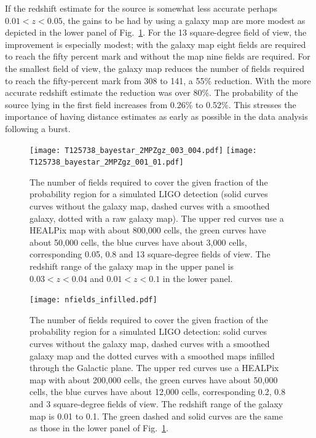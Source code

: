 \documentclass[useAMS,usenatbib]{mn2e}
\begin{document}
If the redshift estimate for the source is somewhat less accurate
perhaps $0.01<z<0.05$, the gains to be had by using a galaxy map are
more modest as depicted in the lower panel of Fig.~\ref{fig:bayestar}.
For the 13 square-degree field of view, the improvement is especially
modest; with the galaxy map eight fields are required to reach the
fifty percent mark and without the map nine fields are required.  For
the smallest field of view, the galaxy map reduces the number of
fields required to reach the fifty-percent mark from 308 to 141, a
55\% reduction.  With the more accurate redshift estimate the
reduction was over 80\%.  The probability of the source lying in the
first field increases from 0.26\% to 0.52\%.  This stresses the
importance of having distance estimates as early as possible in the
data analysis following a burst.
\begin{figure}
  \texttt{[image: T125738\_bayestar\_2MPZgz\_003\_004.pdf]}
  \texttt{[image: T125738\_bayestar\_2MPZgz\_001\_01.pdf]}
  \caption{The number of fields required to cover the given fraction
    of the probability region for a simulated LIGO detection (solid curves
    curves without the galaxy map, dashed curves with a smoothed
    galaxy, dotted with a raw galaxy map).  The upper red
    curves use a HEALPix map with about 800,000 cells, the green
    curves have about 50,000 cells, the blue curves have about
    3,000 cells,
    corresponding 0.05, 0.8  and 13 square-degree fields of
    view. The redshift range of the galaxy map in the upper panel is
    $0.03<z<0.04$ and $0.01<z<0.1$ in the lower panel.}
  \label{fig:bayestar}
\end{figure}

\begin{figure}
  \texttt{[image: nfields\_infilled.pdf]}
  \caption{The number of fields required to cover the given fraction
    of the probability region for a simulated LIGO detection: solid
    curves curves without the galaxy map, dashed curves with a
    smoothed galaxy map and the dotted curves with a smoothed maps
    infilled through the Galactic plane.  The upper red curves use a
    HEALPix map with about 200,000 cells, the green curves have about
    50,000 cells, the blue curves have about 12,000 cells,
    corresponding 0.2, 0.8 and 3 square-degree fields of view. The
    redshift range of the galaxy map is 0.01 to 0.1. The green dashed and solid curves are
    the same as those in the lower panel of Fig.~\ref{fig:bayestar}.}
  \label{fig:bayestar_inf}
\end{figure}
\end{document}
